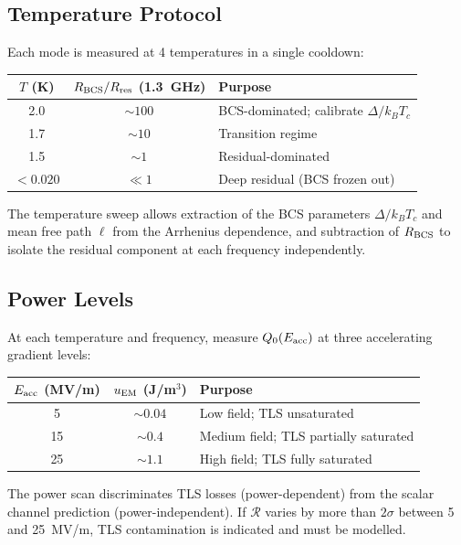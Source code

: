 \documentclass[11pt]{article}
\newcommand{\Rq}{\mathcal{R}}
\begin{document}
\subsection{Temperature Protocol}

Each mode is measured at 4 temperatures in a single cooldown:

\begin{center}
\renewcommand{\arraystretch}{1.2}
\begin{tabular}{@{}ccl@{}}
\toprule
$T$ (K) & $R_{\rm BCS}/R_{\rm res}$ (1.3~GHz) & \textbf{Purpose} \\
\midrule
2.0 & $\sim 100$ & BCS-dominated; calibrate $\Delta/k_BT_c$ \\
1.7 & $\sim 10$ & Transition regime \\
1.5 & $\sim 1$ & Residual-dominated \\
$< 0.020$ & $\ll 1$ & Deep residual (BCS frozen out) \\
\bottomrule
\end{tabular}
\end{center}

The temperature sweep allows extraction of the BCS parameters
$\Delta/k_BT_c$ and mean free path $\ell$ from the Arrhenius
dependence, and subtraction of $R_{\rm BCS}$ to isolate the
residual component at each frequency independently.

\subsection{Power Levels}

At each temperature and frequency, measure $Q_0(E_{\rm acc})$ at
three accelerating gradient levels:

\begin{center}
\renewcommand{\arraystretch}{1.2}
\begin{tabular}{@{}ccl@{}}
\toprule
$E_{\rm acc}$ (MV/m) & $u_{\rm EM}$ (J/m$^3$) & \textbf{Purpose} \\
\midrule
5 & $\sim 0.04$ & Low field; TLS unsaturated \\
15 & $\sim 0.4$ & Medium field; TLS partially saturated \\
25 & $\sim 1.1$ & High field; TLS fully saturated \\
\bottomrule
\end{tabular}
\end{center}

The power scan discriminates TLS losses (power-dependent) from the
scalar channel prediction (power-independent). If $\Rq$ varies by
more than $2\sigma$ between 5 and 25~MV/m, TLS contamination is
indicated and must be modelled.
\end{document}
